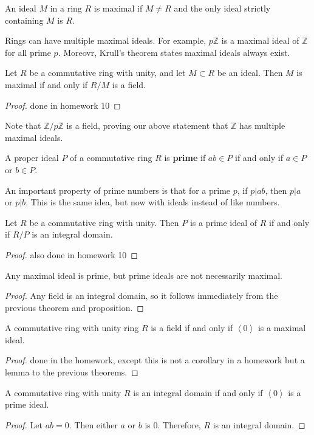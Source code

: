 \begin{definition}\label{dfn:MID}
	An ideal $M$ in a ring $R$ is maximal if $M\neq R$ and the only ideal strictly containing $M$ is $R$.
\end{definition}

Rings can have multiple maximal ideals. For example,  $p\mathbb{Z}$ is a maximal ideal of $\mathbb{Z}$ for all prime $p$. Moreovr, Krull's theorem states maximal ideals always exist.

\begin{theorem}\label{thm:akj}
	Let $R$ be a commutative ring with unity, and let $M\subset R$ be an ideal. Then $M$ is maximal if and only if $R /M$ is a field.
\end{theorem}
\begin{proof}
	done in homework 10
\end{proof}

Note that $\mathbb{Z} / p\mathbb{Z}$ is a field, proving our above statement that $\mathbb{Z}$ has multiple maximal ideals.

\begin{definition}\label{dfn:PrI}
	A proper ideal $P$ of a commutative ring $R$ is \textbf{prime} if $ab\in P$ if and only if $a\in P$ or $b\in P$.
\end{definition}

An important property of prime numbers is that for a prime $p$, if $p|ab$, then $p|a$ or $p|b$. This is the same idea, but now with ideals instead of like numbers.

\begin{proposition}
	Let $R$ be a commutative ring with unity. Then $P$ is a prime ideal of $R$ if and only if $R /P$ is an integral domain.
\end{proposition}
\begin{proof}
	also done in homework 10
\end{proof}
\begin{corollary}
	Any maximal ideal is prime, but prime ideals are not necessarily maximal.
\end{corollary}
\begin{proof}
	Any field is an integral domain, so it follows immediately from the previous theorem and proposition.
\end{proof}

\begin{corollary}
	A commutative ring with unity ring $R$ is a field if and only if $\left\langle 0 \right\rangle $ is a maximal ideal.
\end{corollary}
\begin{proof}
	done in the homework, except this is not a corollary in a homework but a lemma to the previous theorems.
\end{proof}
\begin{proposition}
	A commutative ring with unity $R$ is an integral domain if and only if $\left\langle 0 \right\rangle $ is a prime ideal.
\end{proposition}
\begin{proof}
	Let $ab=0$. Then either $a$ or $b$ is $0$. Therefore, $R$ is an integral domain.
\end{proof}
